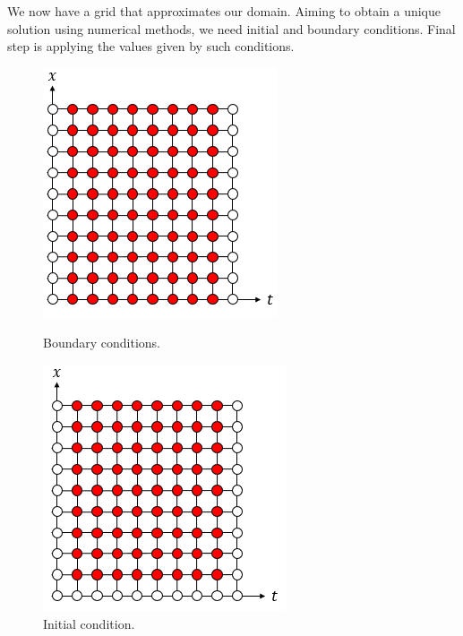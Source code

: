 \documentclass[12pt, oneside]{book}
\theoremstyle{plain}
\theoremstyle{definition}
\begin{document}
We now have a grid that approximates our domain. Aiming to obtain a unique solution using numerical methods, we need initial and boundary conditions. Final step is applying the values given by such conditions.

\begin{figure}[!htb]
  \begin{minipage}[b]{0.5\textwidth}
    \includegraphics[width=\textwidth]{Boundary.png}
    \caption{Boundary conditions.}
  \end{minipage}
  \begin{minipage}[b]{0.5\textwidth}
    \includegraphics[width=\textwidth]{Initial.png}
    \caption{Initial condition.}
  \end{minipage}
\end{figure}
\end{document}
